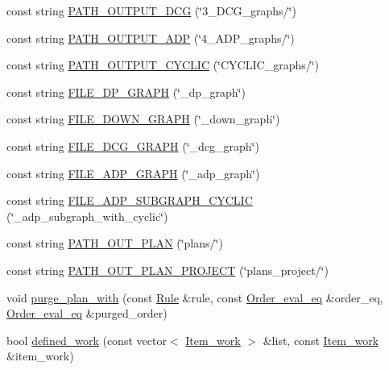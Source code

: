 \begin{CompactItemize}
\item 
const string \hyperlink{namespacegenevalmag_85c614ca01eca9ab0edd6bdf400259fd}{PATH\_\-OUTPUT\_\-DCG} (\char`\"{}3\_\-DCG\_\-graphs/\char`\"{})
\item 
const string \hyperlink{namespacegenevalmag_609ccdf53fd8e4f1526ef4a396323d7d}{PATH\_\-OUTPUT\_\-ADP} (\char`\"{}4\_\-ADP\_\-graphs/\char`\"{})
\item 
const string \hyperlink{namespacegenevalmag_401d9cc13c246072071c64015b3716c8}{PATH\_\-OUTPUT\_\-CYCLIC} (\char`\"{}CYCLIC\_\-graphs/\char`\"{})
\item 
const string \hyperlink{namespacegenevalmag_705fcd9aaf32cd0052ad7909df8994ca}{FILE\_\-DP\_\-GRAPH} (\char`\"{}\_\-dp\_\-graph\char`\"{})
\item 
const string \hyperlink{namespacegenevalmag_bc175fb26b27cb9f1ec2b56cfc390bbe}{FILE\_\-DOWN\_\-GRAPH} (\char`\"{}\_\-down\_\-graph\char`\"{})
\item 
const string \hyperlink{namespacegenevalmag_009f31ef1d07f4ca8786f9e2cc813279}{FILE\_\-DCG\_\-GRAPH} (\char`\"{}\_\-dcg\_\-graph\char`\"{})
\item 
const string \hyperlink{namespacegenevalmag_c89f8e579ae12e809a074364a2aced0c}{FILE\_\-ADP\_\-GRAPH} (\char`\"{}\_\-adp\_\-graph\char`\"{})
\item 
const string \hyperlink{namespacegenevalmag_418104f5a0e7464632745f28884c8017}{FILE\_\-ADP\_\-SUBGRAPH\_\-CYCLIC} (\char`\"{}\_\-adp\_\-subgraph\_\-with\_\-cyclic\char`\"{})
\item 
const string \hyperlink{namespacegenevalmag_605c56dc4a9a367c9da7c7759c7f6b65}{PATH\_\-OUT\_\-PLAN} (\char`\"{}plans/\char`\"{})
\item 
const string \hyperlink{namespacegenevalmag_345f3ac168618479f16dbd899562685e}{PATH\_\-OUT\_\-PLAN\_\-PROJECT} (\char`\"{}plans\_\-project/\char`\"{})
\item 
void \hyperlink{namespacegenevalmag_ce0b7e67565040ba64e1710d0029026b}{purge\_\-plan\_\-with} (const \hyperlink{classgenevalmag_1_1Rule}{Rule} \&rule, const \hyperlink{namespacegenevalmag_0bb2e8b0fa1b07b873f0363719de7b64}{Order\_\-eval\_\-eq} \&order\_\-eq, \hyperlink{namespacegenevalmag_0bb2e8b0fa1b07b873f0363719de7b64}{Order\_\-eval\_\-eq} \&purged\_\-order)
\item 
bool \hyperlink{namespacegenevalmag_d89277e822c1a4d635c554e8c6698e76}{defined\_\-work} (const vector$<$ \hyperlink{structgenevalmag_1_1i__w}{Item\_\-work} $>$ \&list, const \hyperlink{structgenevalmag_1_1i__w}{Item\_\-work} \&item\_\-work)

\end{CompactItemize}
